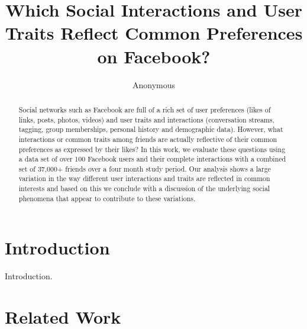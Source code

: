 \documentclass[letterpaper]{article}
\begin{document}
%
\title{Which Social Interactions and User Traits Reflect Common Preferences on Facebook?}
\author{Anonymous}
\maketitle
\begin{abstract}
Social networks such as Facebook are full of a rich set of user preferences (likes of links, posts, photos, videos) and user traits and interactions (conversation streams, tagging, group memberships, personal history and demographic data). However, what interactions or common traits among friends are actually reflective of their common preferences as expressed by their likes? In this work, we evaluate these questions using a data set of over 100 Facebook users and their complete interactions with a combined set of 37,000+ friends over a four month study period. Our analysis shows a large variation in the way different user interactions and traits are reflected in common interests and based on this we conclude with a discussion of the underlying social phenomena that appear to contribute to these variations.
\end{abstract}


\section{Introduction}


Introduction. \cite{influence}


\newpage


\mbox{}


\newpage


\section{Related Work}
\end{document}
